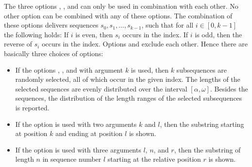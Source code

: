 \documentclass[12pt,titlepage]{article}
\begin{document}
\begin{Showprogramwithoptions}{\VSSS}{}






\Helpoption

\end{Showprogramwithoptions}

The three options , , and
 can only be used in combination with each other.
No other option can be combined with any of these options.
The combination of these options delivers sequences
\(s_{0},s_{1},\ldots,s_{k-1}\), such that for all \(i\in[0,k-1]\) the
following holds:
If \(i\) is even, then \(s_{i}\) occurs in the index. 
If \(i\) is odd, then the reverse of \(s_{i}\) occurs in the index. 
Options  and  exclude each other.
Hence there are basically three choices of options:
\begin{itemize}
\item
If the options , 
, and  with argument \(k\) is used, 
then \(k\) subsequences are randomly selected, all 
of which occur in the given index.
The lengths of the selected sequences are evenly 
distributed over the interval \([\alpha,\omega]\). Besides the sequences,
the distribution of the length ranges of the selected subsequences
is reported. 
\item
If the option  is used with two arguments \(k\) and 
\(l\), then the substring starting at position $k$ and ending at position 
$l$ is shown. 
\item
If the option  is used with three arguments \(l\),
\(n\), and \(r\), then the substring of length $n$ in sequence number
$l$ starting at the relative position $r$ is shown.
\end{itemize}
\end{document}
